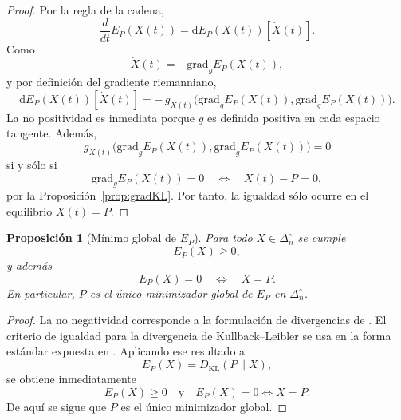 \documentclass[12pt]{article}
\newtheorem{proposicion}{Proposición}[section]
\begin{document}
\begin{proof}
Por la regla de la cadena,
\[
\frac{d}{dt}E_P(X(t))
=
\mathrm dE_P(X(t))[\dot X(t)].
\]
Como
\[
\dot X(t)=-\mathrm{grad}_gE_P(X(t)),
\]
y por definición del gradiente riemanniano,
\[
\mathrm dE_P(X(t))[\dot X(t)]
=
-\,g_{X(t)}\!\bigl(\mathrm{grad}_gE_P(X(t)),\mathrm{grad}_gE_P(X(t))\bigr).
\]
La no positividad es inmediata porque $g$ es definida positiva en cada espacio tangente. Además,
\[
g_{X(t)}\!\bigl(\mathrm{grad}_gE_P(X(t)),\mathrm{grad}_gE_P(X(t))\bigr)=0
\]
si y sólo si
\[
\mathrm{grad}_gE_P(X(t))=0
\quad\Longleftrightarrow\quad
X(t)-P=0,
\]
por la Proposición~\ref{prop:gradKL}. Por tanto, la igualdad sólo ocurre en el equilibrio $X(t)=P$.
\end{proof}

\begin{proposicion}[Mínimo global de $E_P$]\label{prop:minimoGlobalKL}
Para todo $X\in\Delta_n^\circ$ se cumple
\[
E_P(X)\ge 0,
\]
y además
\[
E_P(X)=0
\quad\Longleftrightarrow\quad
X=P.
\]
En particular, $P$ es el único minimizador global de $E_P$ en $\Delta_n^\circ$.
\end{proposicion}

\begin{proof}
La no negatividad corresponde a la formulación de divergencias de \citep{Csiszar1975}. El criterio de igualdad para la divergencia de Kullback--Leibler se usa en la forma estándar expuesta en \citep{CoverThomas1991}. Aplicando ese resultado a
\[
E_P(X)=D_{\mathrm{KL}}(P\|X),
\]
se obtiene inmediatamente
\[
E_P(X)\ge 0
\quad\text{y}\quad
E_P(X)=0 \Longleftrightarrow X=P.
\]
De aquí se sigue que $P$ es el único minimizador global.
\end{proof}
\end{document}
